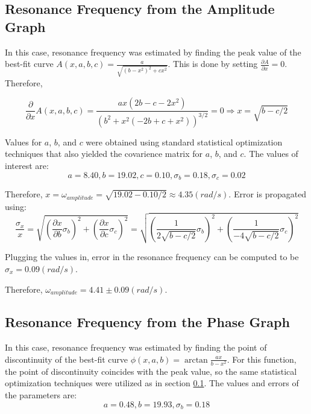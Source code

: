\subsection{ Resonance Frequency from the Amplitude Graph } \label{appendix:errors:res_ampl}

In this case, resonance frequency was estimated by finding the peak value of the best-fit curve $A(x, a, b, c) = \frac{a}{\sqrt{(b-x^2)^2 + cx^2}}$. This is done by setting $\frac{\partial A}{\partial x} = 0$. Therefore,

\begin{equation*}
  \frac{\partial}{\partial x} A(x, a, b, c) = \frac{ax(2b-c-2x^2)}{( b^2 + x^2 (-2b + c + x^2) )^{3/2}} = 0 \Rightarrow x = \sqrt{b - c/2}
\end{equation*}

Values for $a$, $b$, and $c$ were obtained using standard statistical optimization techniques that also yielded the covarience matrix for $a$, $b$, and $c$. The values of interest are:
\begin{equation*}
  a = 8.40, b = 19.02, c = 0.10, \sigma_b = 0.18, \sigma_c = 0.02
\end{equation*}

Therefore, $x = \omega_{amplitude} = \sqrt{19.02 - 0.10 /2} \approx 4.35 (rad/s)$. Error is propagated using:
\begin{equation*}
  \frac{\sigma_{x}}{x} = \sqrt{ \left( \frac{\partial x}{\partial b} \sigma_b \right)^2 + \left( \frac{\partial x}{\partial c} \sigma_c \right)^2} = \sqrt{ \left( \frac{1}{2\sqrt{b - c/2}} \sigma_b \right)^2 + \left( \frac{1}{-4\sqrt{b-c/2}} \sigma_c \right)^2} 
\end{equation*}

Plugging the values in, error in the resonance frequency can be computed to be $\sigma_{x} = 0.09 (rad/s)$.

Therefore, $\omega_{amplitude} = 4.41 \pm 0.09 (rad/s)$.

\subsection{ Resonance Frequency from the Phase Graph } \label{appendix:errors:res_phase}

In this case, resonance frequency was estimated by finding the point of discontinuity of the best-fit curve $\phi(x, a, b) = \arctan \frac{ax}{b - x^2}$. For this function, the point of discontinuity coincides with the peak value, so the same statistical optimization techniques were utilized as in section \ref{appendix:errors:res_ampl}. The values and errors of the parameters are:
\begin{equation*}
  a=0.48, b = 19.93, \sigma_b = 0.18
\end{equation*}


